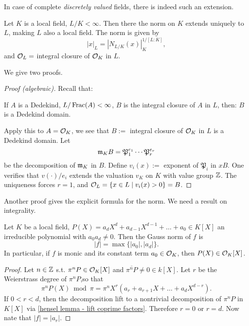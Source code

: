 In case of complete \textit{discretely valued} fields, there is indeed such an extension.
\begin{theorem}\label{unique extension of norm for fintie extension local field}
    Let $K$ is a local field, $L/K < \infty$.
    Then there the norm on $K$ extends uniquely to $L$, making $L$ also a local field.
    The norm is given by \[|x|_L = \left|N_{L/K}(x)\right|_K^{1/[L : K]},\]
    and $\mathcal{O}_L = $ integral closure of $\mathcal{O}_K$ in $L$. 
\end{theorem}
We give two proofs.
\begin{proof}
    [Proof (algebraic)]Recall that:
\begin{lemma}\label{extension of Dedekind: integral closure of Dedekind domain in finite extension of its fraction field is Dedekind domain}
    If $A$ is a Dedekind, $L/\operatorname{Frac}(A) < \infty$, $B$ is the integral closure of $A$ in $L$, then: $B$ is a Dedekind domain.
\end{lemma}
Apply this to $A = \mathcal{O}_K$,
we see that $B :=$ integral closure of $\mathcal{O}_K$ in $L$ is a Dedekind domain.
Let \[\mathfrak{m}_KB = \mathfrak{P}_1^{e_1}\cdots\mathfrak{P}_r^{e_r}\] be the decomposition of $\mathfrak{m}_K$ in $B$. Define $v_i(x) := $ exponent of $\mathfrak{P}_i$ in $xB$.
One verifies that $v(\cdot)/e_i$ extends the valuation $v_K$ on $K$ with value group $\mathbb{Z}$.
The uniqueness forces $r = 1$, and $\mathcal{O}_L = \{x\in L\mid v_i(x) > 0\} = B$.
\end{proof}
Another proof gives the explicit formula for the norm. We need a result on integrality.
\begin{proposition}
    Let $K$ be a local field, $P(X) = a_dX^d + a_{d-1}X^{d-1} + \dots + a_0\in K[X]$ an irreducible polynomial with $a_0a_d\ne 0$.
    Then the Gauss norm of $f$ is
    \[|f| = \max\{|a_0|, |a_d|\}.\]
    In particular, if $f$ is monic and its constant term $a_0\in\mathcal{O}_K$, then $P(X)\in\mathcal{O}_K[X]$.
\end{proposition}
\begin{proof}\label{monic polynomial integral iff const coeff}
    Let $n\in\mathbb{Z}$ s.t. $\pi^nP\in \mathcal{O}_K[X]$ and $\overline{\pi^nP}\ne 0\in k[X] $.
    Let $r$ be the Weierstrass degree of $\pi^nP$,so that \[\pi^nP(X)\bmod\pi = \pi^nX^r(a_r + a_{r+1}X + \dots + a_dX^{d-r}).\] 
    If $0 < r < d$,
    then the decomposition lift to a nontrivial decomposition of $\pi^nP$ in $K[X]$ via \cref{hensel lemma - lift coprime factors}.
    Therefore $r = 0$ or $r = d$.
    Now nate that $|f| = |a_r|$.
\end{proof}
